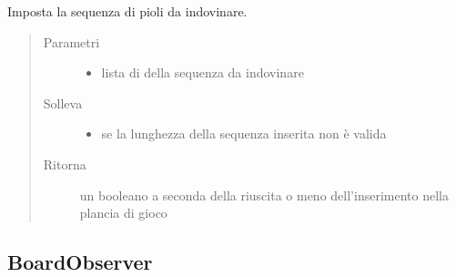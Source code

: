 \documentclass[letterpaper,10pt,italian,openany,oneside]{sphinxmanual}
\begin{document}
\begin{fulllineitems}
\label{\detokenize{source/it/unicam/cs/pa/mastermind/gamecore/BoardModel:it.unicam.cs.pa.mastermind.gamecore.BoardModel.setSequenceToGuess(List)}}
Imposta la sequenza di pioli da indovinare.
\begin{quote}\begin{description}
\item[{Parametri}] \leavevmode\begin{itemize}
\item {} 
 \textendash{} lista di  della sequenza da indovinare

\end{itemize}

\item[{Solleva}] \leavevmode\begin{itemize}
\item {} 
 \textendash{} se la lunghezza della sequenza inserita non è valida

\end{itemize}

\item[{Ritorna}] \leavevmode
un booleano a seconda della riuscita o meno dell’inserimento nella plancia di gioco

\end{description}\end{quote}

\end{fulllineitems}



\subsection{BoardObserver}
\label{\detokenize{source/it/unicam/cs/pa/mastermind/gamecore/BoardObserver:boardobserver}}\label{\detokenize{source/it/unicam/cs/pa/mastermind/gamecore/BoardObserver::doc}}
\end{document}
